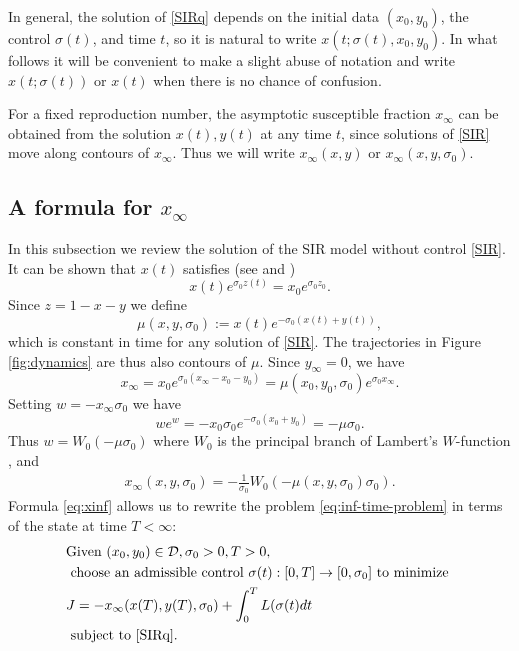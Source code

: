 \documentclass[english,12pt,letter]{article}
\newcommand{\Rnot}{\sigma_0}
\newcommand{\Sinf}{x_\infty}
\newcommand{\dom}{{\mathcal D}}
\begin{document}

In general, the solution of \eqref{SIRq} depends on the initial data
$(x_0,y_0)$, the control $\sigma(t)$, and time $t$, so it is natural to write
$x(t;\sigma(t),x_0,y_0)$.
In what follows it will be convenient to make a slight abuse of notation and
write $x(t;\sigma(t))$ or $x(t)$ when there is no chance of confusion.

For a fixed reproduction number, the asymptotic susceptible fraction $\Sinf$
can be obtained from the solution $x(t), y(t)$ at any time $t$, since solutions
of \eqref{SIR} move along contours of $\Sinf$.  Thus we will write $\Sinf(x,y)$
or $\Sinf(x,y,\Rnot)$.

\subsection{A formula for $\Sinf$}
In this subsection we review the solution of the SIR model without
control \eqref{SIR}.
It can be shown that $x(t)$ satisfies (see \cite{harko2014exact,pakes2015lambert} and
\cite[pp.707-708]{kermack1927contribution})
$$
    x(t)e^{\Rnot z(t)} = x_0 e^{\Rnot z_0}.
$$
Since $z=1-x-y$ we define
$$
   \mu(x,y,\Rnot) := x(t) e^{-\Rnot(x(t)+y(t))},
$$
which is constant in time for any solution of \eqref{SIR}.
The trajectories in Figure \ref{fig:dynamics} are thus also contours of $\mu$.
Since $y_\infty=0$, we have
$$
    x_\infty = x_0 e^{\Rnot(x_\infty-x_0-y_0)} = \mu(x_0,y_0,\Rnot) e^{\Rnot x_\infty}.
$$
Setting $w=-x_\infty \Rnot$ we have
$$
    we^w = -x_0 \Rnot e^{-\Rnot(x_0+y_0)} = -\mu \Rnot.
$$
Thus $w = W_0(-\mu\Rnot)$ where $W_0$ is the principal branch of Lambert's $W$-function \cite{pakes2015lambert},
and
\begin{align} \label{eq:xinf}
    x_\infty(x,y,\sigma_0) = -\frac{1}{\Rnot}W_0(-\mu(x,y,\sigma_0) \Rnot).
\end{align}
Formula \eqref{eq:xinf} allows us to rewrite the problem \eqref{eq:inf-time-problem} in
terms of the state at time $T<\infty$:
\begin{align} \label{eq:basic-problem}
\begin{aligned}
& \text{Given } (x_0, y_0) \in \dom, \sigma_0>0, T>0,  \\
& \text{ choose an admissible control } \sigma(t): [0,T] \to [0,\Rnot] \text{ to minimize }  \\
&     J = -x_\infty(x(T),y(T),\sigma_0) + \int_0^T L(\sigma(t) dt \\
& \text{ subject to } \eqref{SIRq}.
\end{aligned}
\end{align}
\end{document}
